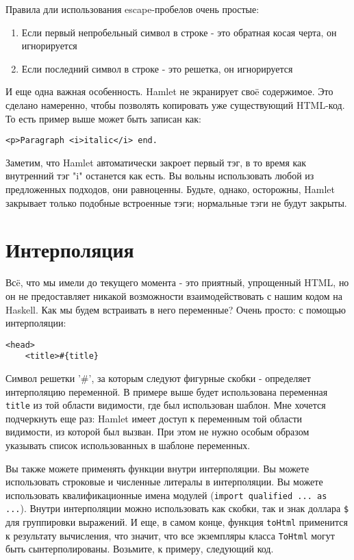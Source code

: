 Правила дли использования escape-пробелов очень простые:
\begin{enumerate}
\item Если первый непробельный символ в строке - это обратная косая черта, 
он игнорируется
\item Если последний символ в строке - это решетка, он игнорируется
\end{enumerate}

И еще одна важная особенность. Hamlet не экранирует своë содержимое.
Это сделано намеренно, чтобы позволять копировать уже существующий HTML-код.
То есть пример выше может быть записан как:
\begin{lstlisting}
<p>Paragraph <i>italic</i> end.
\end{lstlisting}

Заметим, что Hamlet автоматически закроет первый тэг, в то время как внутренний
тэг "i" останется как есть. Вы вольны использовать любой из предложенных
подходов, они равноценны. Будьте, однако, осторожны, Hamlet закрывает только
подобные встроенные тэги; нормальные тэги не будут закрыты.

\section{Интерполяция}
Всë, что мы имели до текущего момента - это приятный, упрощенный HTML, но он
не предоставляет никакой возможности взаимодействовать с нашим кодом на Haskell.
Как мы будем встраивать в него переменные? Очень просто: с помощью интерполяции:

\begin{lstlisting}
<head>
    <title>#{title}
\end{lstlisting}

Символ решетки '#', за которым следуют фигурные скобки - определяет интерполяцию
переменной. В примере выше будет использована переменная \lstinline!title! из той
области видимости, где был использован шаблон. Мне хочется подчеркнуть еще раз:
Hamlet имеет доступ к переменным той области видимости, из которой был вызван.
При этом не нужно особым образом указывать список использованных в шаблоне переменных.

Вы также можете применять функции внутри интерполяции. Вы можете использовать
строковые и численные литералы в интерполяции. Вы можете использовать 
квалификационные имена модулей (\lstinline!import qualified ... as ...!). Внутри
интерполяции можно использовать как скобки, так и знак доллара \texttt{\$}
для группировки выражений. И еще, в самом конце, функция \lstinline!toHtml!
применится к результату вычисления, что значит, что все экземпляры класса 
\lstinline!ToHtml! могут быть сынтерполированы. Возьмите, к примеру, следующий код.

